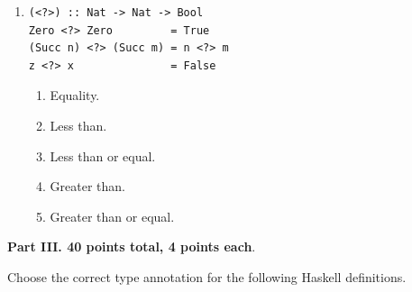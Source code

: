 \documentclass[12pt]{article}
\begin{document}
\begin{enumerate}[resume]
\pagebreak


\item \begin{verbatim}
(<?>) :: Nat -> Nat -> Bool
Zero <?> Zero         = True
(Succ n) <?> (Succ m) = n <?> m
z <?> x               = False
\end{verbatim}
\begin{enumerate}
\item Equality.
\item Less than.
\item Less than or equal.
\item Greater than.
\item Greater than or equal.
\end{enumerate}

\end{enumerate}

\pagebreak

\noindent
{\bf {\textsc Part III.} 40 points total, 4 points each}.

\noindent
Choose the correct type annotation for the following Haskell definitions.
\end{document}
